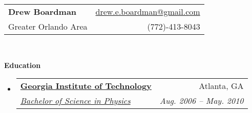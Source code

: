 \documentclass[letterpaper,11pt]{article}
\makeatletter
\newcommand{\resheading}[1]{{\large \colorbox{mygrey}{\begin{minipage}{\textwidth}{\textbf{#1 \vphantom{p\^{E}}}}\end{minipage}}}}
\newcommand{\ressubheading}[4]{
\begin{tabular*}{6.5in}{l@{\extracolsep{\fill}}r}
		\textbf{#1} & #2 \\
		\textit{#3} & \textit{#4} \\
\end{tabular*}\vspace{-6pt}}
\makeatother
\begin{document}
\newcommand{\mywebheader}{
\begin{tabular*}{7in}{l@{\extracolsep{\fill}}r}
	\textbf{{\LARGE Drew Boardman}} & \href{mailto:drew.e.boardman@gmail.com}{drew.e.boardman@gmail.com}\\
	{\footnotesize {Greater Orlando Area}} & {(772)-413-8043} \\
\end{tabular*}
\\
\vspace{0.1in}}

\mywebheader

\resheading{Education}
\begin{itemize}
\item
\ressubheading{\href{http://www.gatech.edu}{Georgia Institute of Technology}}{Atlanta, GA}{\href{http://www.catalog.gatech.edu/colleges/cos/physics/ugrad/phy/geninfo.php}{Bachelor of Science in Physics}}{Aug. 2006 -- May. 2010}
\end{itemize} %
\end{document}

